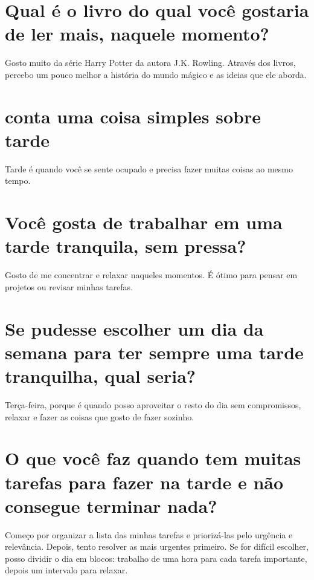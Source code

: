 \documentclass[11pt,a4paper]{article}
\begin{document}
\section{Qual é o livro do qual você gostaria de ler mais, naquele momento?}
Gosto muito da série Harry Potter da autora J.K. Rowling. Através dos livros, percebo um pouco melhor a história do mundo mágico e as ideias que ele aborda.

\section{conta uma coisa simples sobre tarde}
Tarde é quando você se sente ocupado e precisa fazer muitas coisas ao mesmo tempo.

\section{Você gosta de trabalhar em uma tarde tranquila, sem pressa?}
Gosto de me concentrar e relaxar naqueles momentos. É ótimo para pensar em projetos ou revisar minhas tarefas.

\section{Se pudesse escolher um dia da semana para ter sempre uma tarde tranquilha, qual seria?}
Terça-feira, porque é quando posso aproveitar o resto do dia sem compromissos, relaxar e fazer as coisas que gosto de fazer sozinho.

\section{O que você faz quando tem muitas tarefas para fazer na tarde e não consegue terminar nada?}
Começo por organizar a lista das minhas tarefas e priorizá-las pelo urgência e relevância. Depois, tento resolver as mais urgentes primeiro. Se for difícil escolher, posso dividir o dia em blocos: trabalho de uma hora para cada tarefa importante, depois um intervalo para relaxar.
\end{document}
